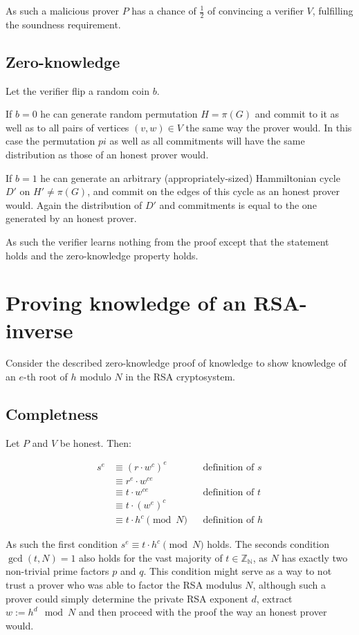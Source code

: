 \documentclass[a4paper]{scrreprt}
\begin{document}
As such a malicious prover $P$ has a chance of $\frac{1}{2}$ of convincing a
verifier $V$, fulfilling the soundness requirement.

\subsection{Zero-knowledge}

Let the verifier flip a random coin $b$.

If $b = 0$ he can generate random permutation $H = \pi(G)$ and commit to it as
well as to all pairs of vertices $(v, w) \in V$ the same way the prover would.
In this case the permutation $pi$ as well as all commitments will have the same
distribution as those of an honest prover would.

If $b = 1$ he can generate an arbitrary (appropriately-sized) Hammiltonian
cycle $D'$ on $H' \neq \pi(G)$, and commit on the edges of this cycle as an
honest prover would. Again the distribution of $D'$ and commitments is equal to
the one generated by an honest prover.

As such the verifier learns nothing from the proof except that the statement
holds and the zero-knowledge property holds.

\section{Proving knowledge of an RSA-inverse}

Consider the described zero-knowledge proof of knowledge to show knowledge of
an $e$-th root of $h$ modulo $N$ in the RSA cryptosystem.

\subsection{Completness}

Let $P$ and $V$ be honest. Then:

\begin{align*}
		s^e & \equiv (r \cdot w^c)^e && \text{definition of $s$} \\
			& \equiv r^e \cdot w^{ce} \\
			& \equiv t \cdot w^{ce} && \text{definition of $t$} \\
			& \equiv t \cdot (w^{e})^{c} \\
			& \equiv t \cdot h^{c} \pmod{N} && \text{definition of $h$}
\end{align*}

As such the first condition $s^e \equiv t \cdot h^c \pmod{N}$ holds. The
seconds condition $\operatorname{gcd}(t, N) = 1$ also holds for the vast
majority of $t \in \mathbb{Z_N}$, as $N$ has exactly two non-trivial prime
factors $p$ and $q$. This condition might serve as a way to not trust a prover
who was able to factor the RSA modulus $N$, although such a prover could simply
determine the private RSA exponent $d$, extract $w := h^d \mod N$ and then
proceed with the proof the way an honest prover would.
\end{document}
